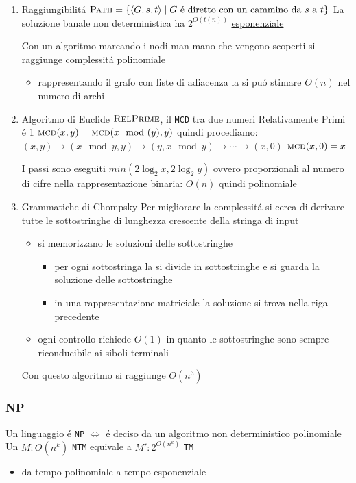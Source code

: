 \documentclass[11pt]{article}
\begin{document}
\begin{enumerate}
\item Raggiungibilitá
\label{sec:org3a5f63d}
\(\textsc{Path} = \{ \langle G,s,t  \rangle \mid G \text{ é  diretto con un cammino da }s \text{ a } t \}\)
La soluzione banale non deterministica ha \(2^{O(t(n))}\) \uline{esponenziale}

Con un algoritmo marcando i nodi man mano che vengono scoperti si raggiunge complessitá \uline{polinomiale}
\begin{itemize}
\item rappresentando il grafo con liste di adiacenza la si puó stimare \(O(n)\) nel numero di archi
\end{itemize}
\item Algoritmo di Euclide
\label{sec:org8c5d8d0}
\(\textsc{RelPrime}\), il \texttt{MCD} tra due numeri Relativamente Primi é 1
\(\textsc{mcd}(x,y) = \textsc{mcd}(x \mod(y), y)\)
quindi procediamo:
\((x,y) \to (x \mod{y}, y) \to (y, x\mod{y})\to \cdots \to (x,0)\)
\(\textsc{mcd}(x,0) = x\)

I passi sono eseguiti \(min(2 \log_{2} x, 2\log_{2} y)\) ovvero proporzionali al numero di cifre nella rappresentazione binaria: \(O(n)\) quindi \uline{polinomiale}

\item Grammatiche di Chompsky
\label{sec:org19fe40f}
Per migliorare la complessitá si cerca di derivare tutte le sottostringhe di lunghezza crescente della stringa di input
\begin{itemize}
\item si memorizzano le soluzioni delle sottostringhe
\begin{itemize}
\item per ogni sottostringa la si divide in sottostringhe e si guarda la soluzione delle sottostringhe
\item in una rappresentazione matriciale la soluzione si trova nella riga precedente
\end{itemize}
\item ogni controllo richiede \(O(1)\) in quanto le sottostringhe sono sempre riconducibile ai siboli terminali
\end{itemize}
Con questo algoritmo si raggiunge \(O(n^3)\)
\end{enumerate}

\subsubsection{NP}
\label{sec:orgd991ceb}
Un linguaggio é \texttt{NP} \(\iff\) é deciso da un algoritmo \uline{non deterministico polinomiale}
Un \(M: O(n^k)\) \texttt{NTM} equivale a \(M': 2^{O(n^k)}\) \texttt{TM}
\begin{itemize}
\item da tempo polinomiale a tempo esponenziale
\end{itemize}
\end{document}

